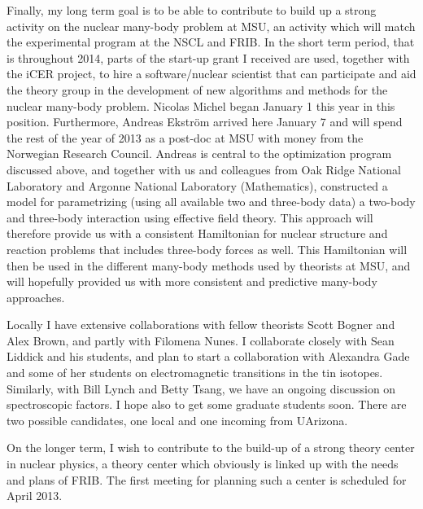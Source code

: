 \documentclass[prc,amsart,english,twocolumn,superscriptaddress,showpacs,floatfix]{revtex4}
\begin{document}
Finally, my long term goal is to be able to contribute to build up a strong activity on the nuclear many-body problem at MSU, an activity 
which will match the experimental program at the NSCL and FRIB. In the short term period, that is throughout 2014, parts of the start-up grant 
I received are used, together with the iCER project,
to hire a software/nuclear scientist  that can participate and aid the theory group in the development 
of new algorithms and methods for the nuclear many-body problem. 
Nicolas Michel began January 1 this year in this position. Furthermore, 
Andreas Ekstr\"om arrived here January 7 and will spend the rest of the year of 2013 as a post-doc at MSU with money from the Norwegian Research Council.
Andreas is central to the optimization program discussed above, and  together with us and 
colleagues  from Oak Ridge 
National Laboratory and Argonne National Laboratory (Mathematics), constructed a model for parametrizing (using all available two and three-body data)
a two-body and three-body interaction using effective field theory. This approach will therefore provide us with 
a consistent Hamiltonian for nuclear structure and reaction problems that includes three-body forces
as well. This Hamiltonian will then be used in the different many-body methods used by theorists at MSU, 
and will hopefully provided us with more consistent and predictive many-body approaches. 

Locally I have extensive collaborations with fellow theorists Scott Bogner and Alex Brown, and partly with Filomena Nunes. I collaborate closely with 
Sean Liddick and his students, and plan to start a collaboration with Alexandra Gade and some of her students on electromagnetic transitions in the tin isotopes.
Similarly, with Bill Lynch and Betty  Tsang, we have an ongoing discussion on spectroscopic factors. I hope also to get some graduate students soon.
There are two possible candidates, one local and one incoming from UArizona. 

On the longer term, I wish to contribute to the build-up of a strong theory center in nuclear physics, a theory
center which obviously is linked up with the needs and plans of FRIB. The first meeting for planning such a center is scheduled for April 2013. 




 
\end{document}
